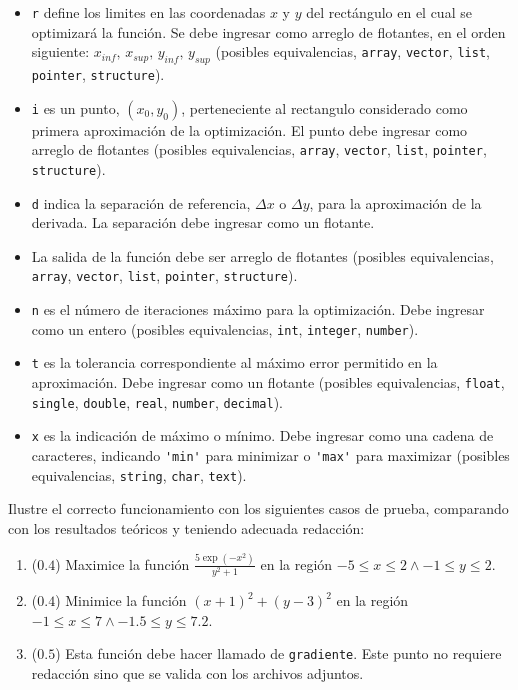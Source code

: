 \documentclass[12pt]{article}
\begin{document}
\begin{enumerate}[leftmargin=*,widest=9]
\begin{itemize}
        \item \verb-r- define los limites en las coordenadas \(x\) y \(y\) del rectángulo en el cual se optimizará la función. Se debe ingresar como arreglo de flotantes, en el orden siguiente: \(x_{inf},\, x_{sup},\, y_{inf},\, y_{sup}\) (posibles equivalencias, \verb-array-, \verb-vector-, \verb-list-, \verb-pointer-, \verb-structure-).
    \item \verb-i- es un punto, \((x_0,y_0)\), perteneciente al rectangulo considerado como primera aproximación de la optimización. El punto debe ingresar como arreglo de flotantes (posibles equivalencias, \verb-array-, \verb-vector-, \verb-list-, \verb-pointer-, \verb-structure-).
    \item \verb-d- indica la separación de referencia, \(\Delta x\) o \(\Delta y\), para la aproximación de la derivada. La separación debe ingresar como un flotante.
    \item La salida de la función debe ser arreglo de flotantes (posibles equivalencias, \verb-array-, \verb-vector-, \verb-list-, \verb-pointer-, \verb-structure-).
    \item \verb-n- es el número de iteraciones máximo para la optimización. Debe ingresar como un entero (posibles equivalencias, \verb-int-, \verb-integer-, \verb-number-).
    \item \verb-t- es la tolerancia correspondiente al máximo error permitido en la aproximación. Debe ingresar como un flotante (posibles equivalencias, \verb-float-, \verb-single-, \verb-double-, \verb-real-, \verb-number-, \verb-decimal-).
    \item \verb-x- es la indicación de máximo o mínimo. Debe ingresar como una cadena de caracteres, indicando \verb-'min'- para minimizar o \verb-'max'- para maximizar (posibles equivalencias, \verb-string-, \verb-char-, \verb-text-).
    \end{itemize}
    Ilustre el correcto funcionamiento con los siguientes casos de prueba, comparando con los resultados teóricos y teniendo adecuada redacción:
   \begin{enumerate}[label=\alph*]
    \item ($0.4$) Maximice la función {\large \(\frac{5\exp(-x^2)}{y^2+1}\)} en la región \(-5\leq x \leq 2 \wedge -1 \leq y \leq 2\).
    \item ($0.4$) Minimice la función \((x+1)^2 + (y-3)^2\) en la región \(-1\leq x \leq 7 \wedge -1.5 \leq y \leq 7.2\).
    \item ($0.5$) Esta función debe hacer llamado de \verb-gradiente-. Este punto no requiere redacción sino que se valida con los archivos adjuntos.

\end{enumerate}
\end{enumerate}
\end{document}
